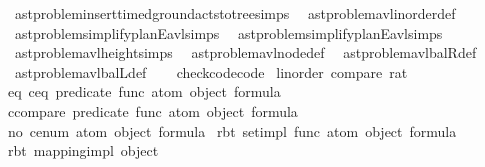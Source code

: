 \begin{isabellebody}
\ \ ast{\isacharunderscore}{\kern0pt}problem{\isachardot}{\kern0pt}insert{\isacharunderscore}{\kern0pt}timed{\isacharunderscore}{\kern0pt}ground{\isacharunderscore}{\kern0pt}acts{\isacharunderscore}{\kern0pt}to{\isacharunderscore}{\kern0pt}tree{\isachardot}{\kern0pt}simps\isanewline
\ \ ast{\isacharunderscore}{\kern0pt}problem{\isachardot}{\kern0pt}avl{\isacharunderscore}{\kern0pt}inorder{\isacharunderscore}{\kern0pt}def\isanewline
\ \ ast{\isacharunderscore}{\kern0pt}problem{\isachardot}{\kern0pt}simplify{\isacharunderscore}{\kern0pt}planE{\isacharunderscore}{\kern0pt}avl{\isachardot}{\kern0pt}simps\isanewline
\ \ ast{\isacharunderscore}{\kern0pt}problem{\isachardot}{\kern0pt}simplify{\isacharunderscore}{\kern0pt}planE{\isacharunderscore}{\kern0pt}avl{\isacharprime}{\kern0pt}{\isachardot}{\kern0pt}simps\isanewline
\ \ ast{\isacharunderscore}{\kern0pt}problem{\isachardot}{\kern0pt}avl{\isacharunderscore}{\kern0pt}height{\isachardot}{\kern0pt}simps\isanewline
\ \ ast{\isacharunderscore}{\kern0pt}problem{\isachardot}{\kern0pt}avl{\isacharunderscore}{\kern0pt}node{\isacharunderscore}{\kern0pt}def\isanewline
\ \ ast{\isacharunderscore}{\kern0pt}problem{\isachardot}{\kern0pt}avl{\isacharunderscore}{\kern0pt}balR{\isacharunderscore}{\kern0pt}def\isanewline
\ \ ast{\isacharunderscore}{\kern0pt}problem{\isachardot}{\kern0pt}avl{\isacharunderscore}{\kern0pt}balL{\isacharunderscore}{\kern0pt}def\isanewline
\ \ \isanewline
\isanewline
{}\isamarkupfalse%
\ check{\isacharunderscore}{\kern0pt}code{\isacharbrackleft}{\kern0pt}code{\isacharbrackright}{\kern0pt}%
\isadelimdocument
%
\endisadelimdocument
%
\isatagdocument
%
\isamarkuptrue%
%
\endisatagdocument
{\isafolddocument}%
%
\isadelimdocument
%
\endisadelimdocument
{}\isamarkupfalse%
\ {\isacharparenleft}{\kern0pt}linorder{\isacharparenright}{\kern0pt}\ compare\ rat\isanewline
\isanewline
{}\isamarkupfalse%
\ {\isacharparenleft}{\kern0pt}eq{\isacharparenright}{\kern0pt}\ ceq\ predicate\ func\ atom\ object\ formula\ \isanewline
{}\isamarkupfalse%
\ ccompare\ predicate\ func\ atom\ object\ formula\isanewline
{}\isamarkupfalse%
\ {\isacharparenleft}{\kern0pt}no{\isacharparenright}{\kern0pt}\ cenum\ atom\ object\ formula\isanewline
{}\isamarkupfalse%
\ {\isacharparenleft}{\kern0pt}rbt{\isacharparenright}{\kern0pt}\ set{\isacharunderscore}{\kern0pt}impl\ func\ atom\ object\ formula\isanewline
\isanewline
{}\isamarkupfalse%
\ {\isacharparenleft}{\kern0pt}rbt{\isacharparenright}{\kern0pt}\ mapping{\isacharunderscore}{\kern0pt}impl\ object\isanewline

\end{isabellebody}
